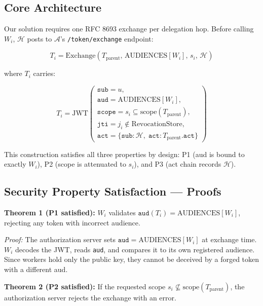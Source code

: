 \documentclass[journal]{IEEEtran}
\begin{document}
\subsection{Core Architecture}

Our solution requires one RFC 8693 exchange per delegation hop. Before calling $W_i$, $\mathcal{H}$ posts to $\mathcal{A}$'s \texttt{/token/exchange} endpoint:

\begin{equation}
T_i = \text{Exchange}(T_{\text{parent}},\, \text{AUDIENCES}[W_i],\, s_i,\, \mathcal{H})
\label{eq:exchange}
\end{equation}

where $T_i$ carries:

\begin{equation}
T_i = \text{JWT}\!\left(\begin{array}{l}
  \texttt{sub} = u,\\
  \texttt{aud} = \text{AUDIENCES}[W_i],\\
  \texttt{scope} = s_i \subseteq \text{scope}(T_{\text{parent}}),\\
  \texttt{jti} = j_i \notin \text{RevocationStore},\\
  \texttt{act} = \{\texttt{sub}: \mathcal{H},\; \texttt{act}: T_{\text{parent}}.\texttt{act}\}
\end{array}\right)
\end{equation}

This construction satisfies all three properties by design: P1 (aud is bound to exactly $W_i$), P2 (scope is attenuated to $s_i$), and P3 (act chain records $\mathcal{H}$).

\subsection{Security Property Satisfaction — Proofs}

\textbf{Theorem 1 (P1 satisfied):} $W_i$ validates $\texttt{aud}(T_i) = \text{AUDIENCES}[W_i]$, rejecting any token with incorrect audience.

\textit{Proof:} The authorization server sets $\texttt{aud} = \text{AUDIENCES}[W_i]$ at exchange time. $W_i$ decodes the JWT, reads \texttt{aud}, and compares it to its own registered audience. Since workers hold only the public key, they cannot be deceived by a forged token with a different aud.

\textbf{Theorem 2 (P2 satisfied):} If the requested scope $s_i \not\subseteq \text{scope}(T_{\text{parent}})$, the authorization server rejects the exchange with an error.
\end{document}
